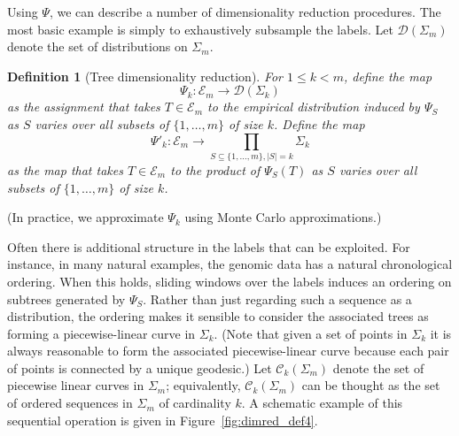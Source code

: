 \documentclass[a4paper,11pt]{article}
\newtheorem{definition}[theorem]{Definition}
\newcommand{\aC}{\mathcal{C}}
\newcommand{\aD}{\mathcal{D}}
\newcommand{\aE}{\mathcal{E}}
\begin{document}
Using $\Psi$, we can describe a number of dimensionality reduction procedures.
The most basic example is simply to exhaustively subsample the labels.
Let $\aD(\Sigma_m)$ denote the set of distributions on $\Sigma_m$.

\begin{definition}[Tree dimensionality reduction]
For $1 \leq k < m$, define the map
\[
\Psi_k \colon \aE_m \to \aD(\Sigma_k)
\]
as the assignment that takes $T \in \aE_m$ to the empirical distribution induced by $\Psi_S$ as $S$ varies over all subsets of $\{1,\ldots,m\}$ of size $k$.
Define the map
\[
\Psi'_k \colon \aE_m \to \prod_{S \subseteq \{1,\ldots,m\}, |S| = k} \Sigma_k 
\]
as the map that takes $T \in \aE_m$ to the product of $\Psi_S(T)$ as $S$ varies over all subsets of $\{1, \ldots, m\}$ of size $k$.
\end{definition}

(In practice, we approximate $\Psi_k$ using Monte Carlo approximations.)

Often there is additional structure in the labels that can be exploited.
For instance, in many natural examples, the genomic data has a natural chronological ordering.
When this holds, sliding windows over the labels induces an ordering on subtrees generated by $\Psi_S$.
Rather than just regarding such a sequence as a distribution, the ordering makes it sensible to consider the associated trees as forming a piecewise-linear curve in $\Sigma_k$.
(Note that given a set of points in $\Sigma_k$ it is always reasonable to form the associated piecewise-linear curve because each pair of points is connected by a unique geodesic.)
Let $\aC_k(\Sigma_m)$ denote the set of piecewise linear curves in $\Sigma_m$; equivalently, $\aC_k(\Sigma_m)$ can be thought as the set of ordered sequences in $\Sigma_m$ of cardinality $k$.
A schematic example of this sequential operation is given in Figure~\ref{fig:dimred_def4}.
\end{document}
